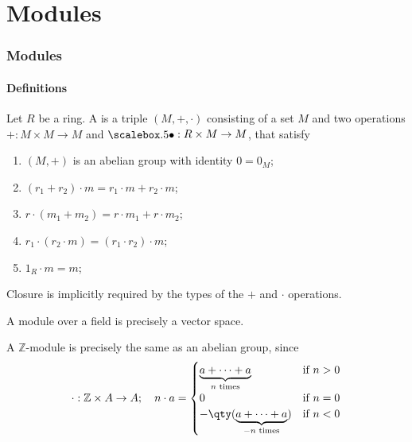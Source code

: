 \part{Modules}

\section{Modules}

\subsection{Definitions}
\begin{definition}[Module]
	Let $R$ be a ring.
	A  is a triple $(M, +, \cdot)$ consisting of a set $M$ and two operations $+ : M \times M \to M$ and $\bigcdot : R \times M \to M$, that satisfy
	\begin{enumerate}
		\item $(M, +)$ is an abelian group with identity $0 = 0_M$;
		\item $(r_1 + r_2) \cdot m = r_1 \cdot m + r_2 \cdot m$;
		\item $r \cdot (m_1 + m_2) = r \cdot m_1 + r \cdot m_2$;
		\item $r_1 \cdot (r_2 \cdot m) = (r_1 \cdot r_2) \cdot m$;
		\item $1_R \cdot m = m$;
	\end{enumerate}
\end{definition}

\begin{remark}
	Closure is implicitly required by the types of the $+$ and $\cdot$ operations.
\end{remark}

\begin{example}
	A module over a field is precisely a vector space.
\end{example} 

\begin{example}
	A $\mathbb Z$-module is precisely the same as an abelian group, since
	\begin{align*}
		\cdot : \mathbb Z \times A \to A;\quad n \cdot a = \begin{cases}
			\underbrace{a + \dots + a}_{n \text{ times}}         & \text{if } n > 0 \\
			0                                                    & \text{if } n = 0 \\
			-\qty(\underbrace{a + \dots + a}_{-n \text{ times}}) & \text{if } n < 0
		\end{cases}
	\end{align*}
\end{example}

